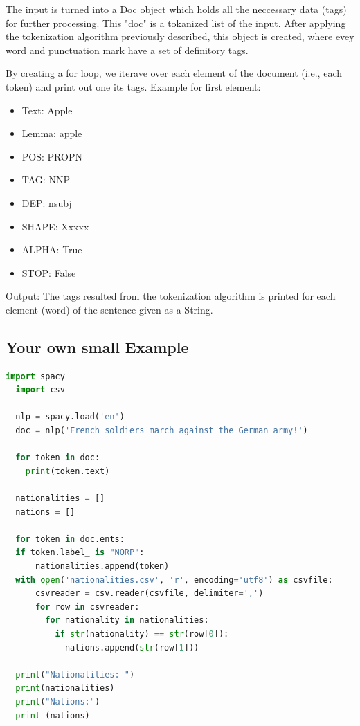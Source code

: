 \documentclass[a4paper,10pt]{article}
\begin{document}
  The input is turned into a Doc object which holds all the neccessary data (tags) for further processing.
  This "doc" is a tokanized list of the input. After applying the tokenization algorithm previously described, 
  this object is created, where evey word and punctuation mark have a set of definitory tags.

  By creating a for loop, we iterave over each element of the document (i.e., each token) and print out one its tags.
  Example for first element:
   \begin{itemize}
  \item Text: Apple
  \item Lemma: apple
   \item POS: PROPN
  \item TAG: NNP
  \item DEP: nsubj
  \item SHAPE: Xxxxx
 \item ALPHA: True
 \item  STOP: False
 \end{itemize}

  Output: The tags resulted from the tokenization algorithm is printed for each element (word) of the sentence given as a String.

 \subsection{Your own small Example}
 
 \begin{lstlisting}[language=Python]
  import spacy 
  import csv 
  
  nlp = spacy.load('en') 
  doc = nlp('French soldiers march against the German army!') 
  
  for token in doc: 
    print(token.text) 
    
  nationalities = [] 
  nations = [] 
  
  for token in doc.ents: 
  if token.label_ is "NORP": 
      nationalities.append(token) 
  with open('nationalities.csv', 'r', encoding='utf8') as csvfile:
      csvreader = csv.reader(csvfile, delimiter=',') 
      for row in csvreader:
        for nationality in nationalities:
          if str(nationality) == str(row[0]):
            nations.append(str(row[1])) 
            
  print("Nationalities: ") 
  print(nationalities)
  print("Nations:")
  print (nations)
    
\end{lstlisting}
\end{document}
